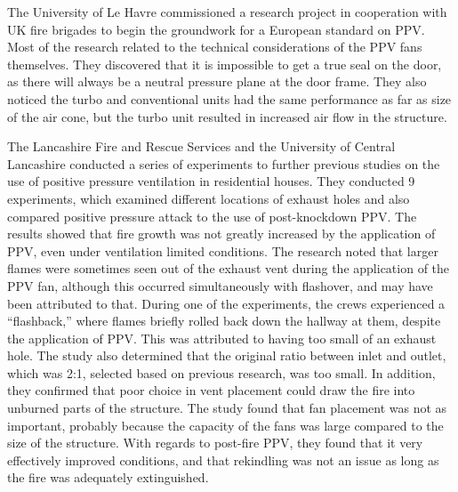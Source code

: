 \documentclass{article}
\begin{document}
\begin{appendices}
The University of Le Havre commissioned a research project in cooperation with UK fire brigades to begin the groundwork for a European standard on PPV. Most of the research related to the technical considerations of the PPV fans themselves. They discovered that it is impossible to get a true seal on the door, as there will always be a neutral pressure plane at the door frame. They also noticed the turbo and conventional units had the same performance as far as size of the air cone, but the turbo unit resulted in increased air flow in the structure.\cite{LeHavrePPV}
	
The Lancashire Fire and Rescue Services and the University of Central Lancashire conducted a series of experiments to further previous studies on the use of positive pressure ventilation in residential houses. They conducted 9 experiments, which examined different locations of exhaust holes and also compared positive pressure attack to the use of post-knockdown PPV. The results showed that fire growth was not greatly increased by the application of PPV, even under ventilation limited conditions. The research noted that larger flames were sometimes seen out of the exhaust vent during the application of the PPV fan, although this occurred simultaneously with flashover, and may have been attributed to that. During one of the experiments, the crews experienced a “flashback,” where flames briefly rolled back down the hallway at them, despite the application of PPV. This was attributed to having too small of an exhaust hole. The study also determined that the original ratio between inlet and outlet, which was 2:1, selected based on previous research, was too small. In addition, they confirmed that poor choice in vent placement could draw the fire into unburned parts of the structure. The study found that fan placement was not as important, probably because the capacity of the fans was large compared to the size of the structure. With regards to post-fire PPV, they found that it very effectively improved conditions, and that rekindling was not an issue as long as the fire was adequately extinguished.\cite{StottPreston}
	

\end{appendices}
\end{document}
